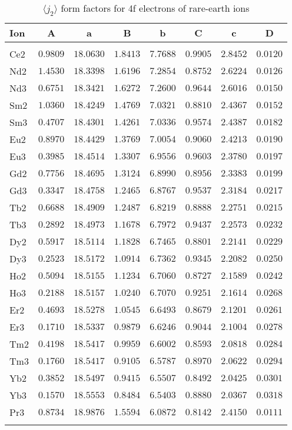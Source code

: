 \begin{table}[H]
\caption{$\langle j_2\rangle$ form factors for 4f electrons of rare-earth ions}
\vspace{2mm}
\label{re4fj2}
{\tablesize 
\begin{tabular}{lrrrrrrr}
\hline
Ion&
\multicolumn{1}{c}{A}&\multicolumn{1}{c}{a}&
\multicolumn{1}{c}{B}&\multicolumn{1}{c}{b}&
\multicolumn{1}{c}{C}&\multicolumn{1}{c}{c}&\multicolumn{1}{c}{D}\\
\hline\\[-2ex]
Ce2 &$0.9809$ &$18.0630$ &$1.8413$ &$7.7688$ &$0.9905$ &$2.8452$ &$0.0120$ \\
Nd2 &$1.4530$ &$18.3398$ &$1.6196$ &$7.2854$ &$0.8752$ &$2.6224$ &$0.0126$ \\
Nd3 &$0.6751$ &$18.3421$ &$1.6272$ &$7.2600$ &$0.9644$ &$2.6016$ &$0.0150$ \\
Sm2 &$1.0360$ &$18.4249$ &$1.4769$ &$7.0321$ &$0.8810$ &$2.4367$ &$0.0152$ \\
Sm3 &$0.4707$ &$18.4301$ &$1.4261$ &$7.0336$ &$0.9574$ &$2.4387$ &$0.0182$ \\
Eu2 &$0.8970$ &$18.4429$ &$1.3769$ &$7.0054$ &$0.9060$ &$2.4213$ &$0.0190$ \\
Eu3 &$0.3985$ &$18.4514$ &$1.3307$ &$6.9556$ &$0.9603$ &$2.3780$ &$0.0197$ \\
Gd2 &$0.7756$ &$18.4695$ &$1.3124$ &$6.8990$ &$0.8956$ &$2.3383$ &$0.0199$ \\
Gd3 &$0.3347$ &$18.4758$ &$1.2465$ &$6.8767$ &$0.9537$ &$2.3184$ &$0.0217$ \\
Tb2 &$0.6688$ &$18.4909$ &$1.2487$ &$6.8219$ &$0.8888$ &$2.2751$ &$0.0215$ \\
Tb3 &$0.2892$ &$18.4973$ &$1.1678$ &$6.7972$ &$0.9437$ &$2.2573$ &$0.0232$ \\
Dy2 &$0.5917$ &$18.5114$ &$1.1828$ &$6.7465$ &$0.8801$ &$2.2141$ &$0.0229$ \\
Dy3 &$0.2523$ &$18.5172$ &$1.0914$ &$6.7362$ &$0.9345$ &$2.2082$ &$0.0250$ \\
Ho2 &$0.5094$ &$18.5155$ &$1.1234$ &$6.7060$ &$0.8727$ &$2.1589$ &$0.0242$ \\
Ho3 &$0.2188$ &$18.5157$ &$1.0240$ &$6.7070$ &$0.9251$ &$2.1614$ &$0.0268$ \\
Er2 &$0.4693$ &$18.5278$ &$1.0545$ &$6.6493$ &$0.8679$ &$2.1201$ &$0.0261$ \\
Er3 &$0.1710$ &$18.5337$ &$0.9879$ &$6.6246$ &$0.9044$ &$2.1004$ &$0.0278$ \\
Tm2 &$0.4198$ &$18.5417$ &$0.9959$ &$6.6002$ &$0.8593$ &$2.0818$ &$0.0284$ \\
Tm3 &$0.1760$ &$18.5417$ &$0.9105$ &$6.5787$ &$0.8970$ &$2.0622$ &$0.0294$ \\
Yb2 &$0.3852$ &$18.5497$ &$0.9415$ &$6.5507$ &$0.8492$ &$2.0425$ &$0.0301$ \\
Yb3 &$0.1570$ &$18.5553$ &$0.8484$ &$6.5403$ &$0.8880$ &$2.0367$ &$0.0318$ \\
Pr3 &$0.8734$ &$18.9876$ &$1.5594$ &$6.0872$ &$0.8142$ &$2.4150$ &$0.0111$ \\
\hline\\[-2ex]
\end{tabular}
}
\end{table}
%
